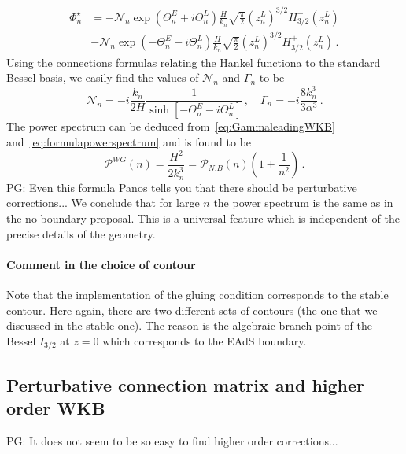 \documentclass[a4paper,11pt]{article}
\newcommand{\purple}[1]{{\color{purple} #1 \color{black}}}
\newcommand{\PG}[1]{{\purple{PG: #1}}} %
\begin{document}
\begin{equation}
\begin{aligned}
        \Phi_n^\star &= -\mathcal{N}_n \exp\left(\Theta_n^E+i\Theta_n^L\right) \frac{H}{k_n}\sqrt{\frac{\pi}{2}}(z_n^L)^{3/2}H^-_{3/2}(z_n^L)\\
        &-\mathcal{N}_n \exp\left(-\Theta_n^E-i\Theta_n^L\right) \frac{H}{k_n}\sqrt{\frac{\pi}{2}}(z_n^L)^{3/2}H^+_{3/2}(z_n^L)
        \,.
\end{aligned}
\end{equation}
Using the connections formulas relating the Hankel functiona to the standard Bessel basis, we easily find the values of $\mathcal{N}_n$ and $\Gamma_n$ to be
\begin{equation}\label{eq:GammaleadingWKB}
    \mathcal{N}_n = -i\frac{k_n}{2H}\frac{1}{\sinh\left[-\Theta_n^E-i\Theta_n^L\right]}\,, \quad \Gamma_n = -i\frac{8 k_n^3}{3\alpha^3}\,.
\end{equation}
The power spectrum can be deduced from~\eqref{eq:GammaleadingWKB} and~\eqref{eq:formulapowerspectrum} and is found to be
\begin{equation}
    \mathcal{P}^{WG}(n) = \frac{H^2}{2k_n^3}=\mathcal{P}_{N.B}(n)\left(1+\frac{1}{n^2}\right) \,.
\end{equation}
\PG{Even this formula Panos tells you that there should be perturbative corrections...}
We conclude that for large $n$ the power spectrum is the same as in the no-boundary proposal. This is a universal feature which is independent of the precise details of the geometry.
\paragraph{Comment in the choice of contour}
Note that the implementation of the gluing condition corresponds to the stable contour. Here again, there are two different sets of contours (the one that we discussed in the stable one). The reason is the algebraic branch point of the Bessel $I_{3/2}$ at $z=0$ which corresponds to the EAdS boundary.

\subsection{Perturbative connection matrix and higher order WKB}

\PG{It does not seem to be so easy to find higher order corrections...}
\end{document}
